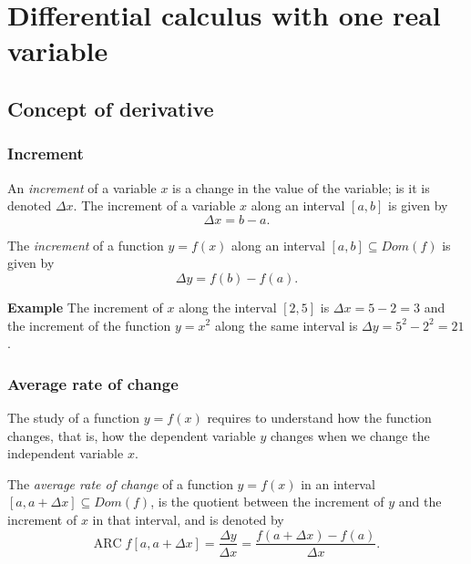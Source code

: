 \section{Differential calculus with one real variable}


\subsection{Concept of derivative}
\begin{frame}
\frametitle{Increment}
\begin{definition}
An \emph{increment} of a variable $x$ is a change in the value of the variable; is it is denoted $\Delta x$.
The increment of a variable $x$ along an interval $[a,b]$ is given by
\[
\Delta x = b-a.
\]
\end{definition}

\begin{definition}
The \emph{increment} of a function $y=f(x)$ along an interval $[a,b]\subseteq Dom(f)$ is given by
\[
\Delta y = f(b)-f(a).
\]
\end{definition}

\textbf{Example} The increment of $x$ along the interval $[2,5]$ is $\Delta x=5-2=3$ and the increment of the function $y=x^2$ along the same interval is $\Delta y=5^2-2^2=21$.
\end{frame}

\begin{frame}
\frametitle{Average rate of change}
The study of a function $y=f(x)$ requires to understand how the function changes, that is, how the dependent variable $y$ changes when we change the independent variable $x$.

\begin{definition}
The  \emph{average rate of change} of a function $y=f(x)$ in an interval $[a,a+\Delta x]\subseteq Dom(f)$, is the quotient between the increment of $y$ and the increment of $x$ in that interval, and is denoted by
\[
\mbox{ARC}\;f[a,a+\Delta x]=\frac{\Delta y}{\Delta x}=\frac{f(a+\Delta x)-f(a)}{\Delta x}.
\]
\end{definition}
\end{frame}

